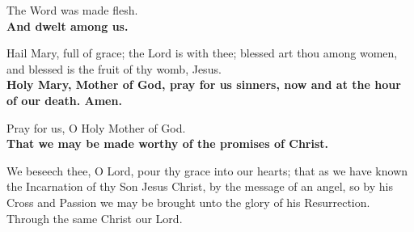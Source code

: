 The Word was made flesh.\\
\textbf{And dwelt among us.}

Hail Mary, full of grace; the Lord is with thee; blessed art thou among women, and blessed is the fruit of thy womb, Jesus.\\
\textbf{Holy Mary, Mother of God, pray for us sinners, now and at the hour of our death. Amen.}

Pray for us, O Holy Mother of God.\\
\textbf{That we may be made worthy of the promises of Christ.}


We beseech thee, O Lord, pour thy grace into our hearts; that as we have
known the Incarnation of thy Son Jesus Christ, by the message of an angel,
so by his \cross Cross and Passion we may be brought unto the glory of his
Resurrection. Through the same Christ our Lord.

